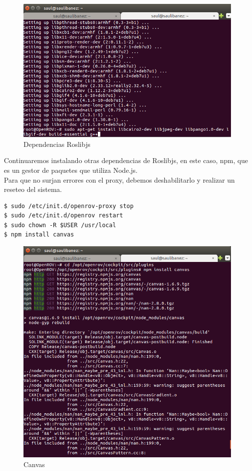 \begin{figure} [hbtp]
  \begin{center}
    \includegraphics[width=12cm]{img/cap4/dependencias_roslibjs}
  \end{center}
  \caption{Dependencias Roslibjs}
  \label{fig:Dependencias Roslibjs}
\end{figure}
\newpage
Continuaremos instalando otras dependencias de Roslibjs, en este caso, npm, que es un gestor de paquetes que utiliza Node.js.
\\Para que no surjan errores con el proxy, debemos deshabilitarlo y realizar un reseteo del sistema. 
\renewcommand{\lstlistingname}{}
\begin{lstlisting}[caption=Dependencias Roslibjs, label={lst:roslibjs}]
$ sudo /etc/init.d/openrov-proxy stop
$ sudo /etc/init.d/openrov restart
$ sudo chown -R $USER /usr/local 
$ npm install canvas 
\end{lstlisting}

\newpage
\begin{figure} [hbtp]
  \begin{center}
    \includegraphics[width=12cm]{img/cap4/canvas}
  \end{center}
  \caption{Canvas}
  \label{fig:canvas}
\end{figure}

